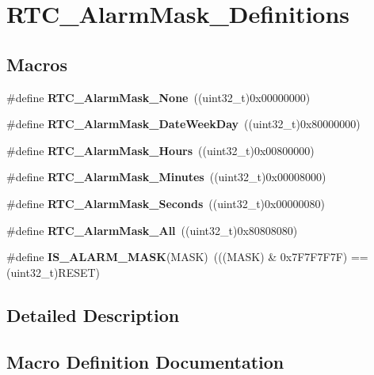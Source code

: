 \section{R\+T\+C\+\_\+\+Alarm\+Mask\+\_\+\+Definitions}
\label{group__RTC__AlarmMask__Definitions}
\subsection*{Macros}
\begin{DoxyCompactItemize}
\item 
\#define \textbf{ R\+T\+C\+\_\+\+Alarm\+Mask\+\_\+\+None}~((uint32\+\_\+t)0x00000000)
\item 
\#define \textbf{ R\+T\+C\+\_\+\+Alarm\+Mask\+\_\+\+Date\+Week\+Day}~((uint32\+\_\+t)0x80000000)
\item 
\#define \textbf{ R\+T\+C\+\_\+\+Alarm\+Mask\+\_\+\+Hours}~((uint32\+\_\+t)0x00800000)
\item 
\#define \textbf{ R\+T\+C\+\_\+\+Alarm\+Mask\+\_\+\+Minutes}~((uint32\+\_\+t)0x00008000)
\item 
\#define \textbf{ R\+T\+C\+\_\+\+Alarm\+Mask\+\_\+\+Seconds}~((uint32\+\_\+t)0x00000080)
\item 
\#define \textbf{ R\+T\+C\+\_\+\+Alarm\+Mask\+\_\+\+All}~((uint32\+\_\+t)0x80808080)
\item 
\#define \textbf{ I\+S\+\_\+\+A\+L\+A\+R\+M\+\_\+\+M\+A\+SK}(M\+A\+SK)~(((M\+A\+SK) \& 0x7\+F7\+F7\+F7\+F) == (uint32\+\_\+t)\+R\+E\+S\+E\+T)
\end{DoxyCompactItemize}


\subsection{Detailed Description}


\subsection{Macro Definition Documentation}
\mbox{\label{group__RTC__AlarmMask__Definitions_gac119b97b072bf9c12e008011ff202a19}} 
